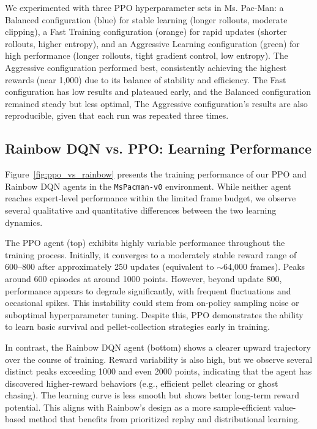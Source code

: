 \documentclass{article}
\begin{document}
We experimented with three PPO hyperparameter sets in Ms. Pac-Man: a Balanced configuration (blue) for stable learning (longer rollouts, moderate clipping), a Fast Training configuration (orange) for rapid updates (shorter rollouts, higher entropy), and an Aggressive Learning configuration (green) for high performance (longer rollouts, tight gradient control, low entropy). The Aggressive configuration performed best, consistently achieving the highest rewards (near 1,000) due to its balance of stability and efficiency. The Fast configuration has low results and plateaued early, and the Balanced configuration remained steady but less optimal, The Aggressive configuration’s results are also reproducible, given that each run was repeated three times.

\subsection{Rainbow DQN vs. PPO: Learning Performance}

Figure~\ref{fig:ppo_vs_rainbow} presents the training performance of our PPO and Rainbow DQN agents in the \texttt{MsPacman-v0} environment. While neither agent reaches expert-level performance within the limited frame budget, we observe several qualitative and quantitative differences between the two learning dynamics.

The PPO agent (top) exhibits highly variable performance throughout the training process. Initially, it converges to a moderately stable reward range of 600–800 after approximately 250 updates (equivalent to $\sim$64,000 frames). Peaks around 600 episodes at around 1000 points. However, beyond update 800, performance appears to degrade significantly, with frequent fluctuations and occasional spikes. This instability could stem from on-policy sampling noise or suboptimal hyperparameter tuning. Despite this, PPO demonstrates the ability to learn basic survival and pellet-collection strategies early in training.

In contrast, the Rainbow DQN agent (bottom) shows a clearer upward trajectory over the course of training. Reward variability is also high, but we observe several distinct peaks exceeding 1000 and even 2000 points, indicating that the agent has discovered higher-reward behaviors (e.g., efficient pellet clearing or ghost chasing). The learning curve is less smooth but shows better long-term reward potential. This aligns with Rainbow’s design as a more sample-efficient value-based method that benefits from prioritized replay and distributional learning.
\end{document}
